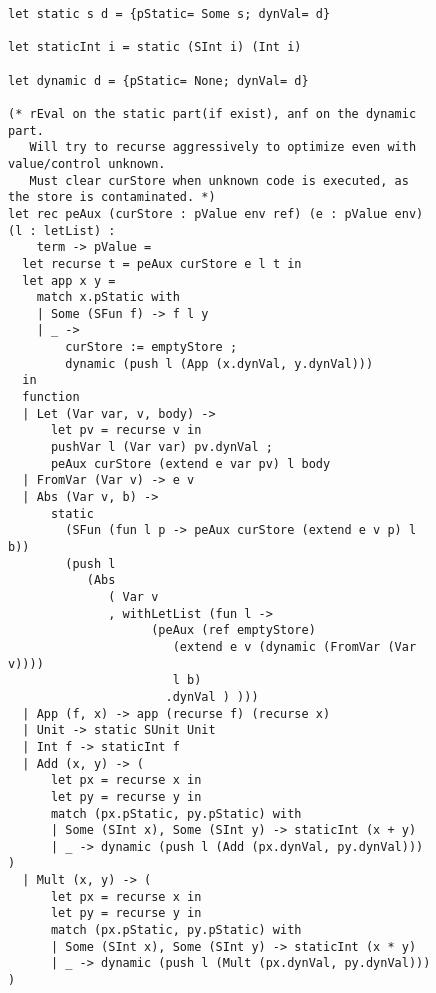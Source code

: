 \begin{figure}[H]
\ContinuedFloat
\begin{verbatim}
let static s d = {pStatic= Some s; dynVal= d}

let staticInt i = static (SInt i) (Int i)

let dynamic d = {pStatic= None; dynVal= d}

(* rEval on the static part(if exist), anf on the dynamic part.
   Will try to recurse aggressively to optimize even with value/control unknown.
   Must clear curStore when unknown code is executed, as the store is contaminated. *)
let rec peAux (curStore : pValue env ref) (e : pValue env) (l : letList) :
    term -> pValue =
  let recurse t = peAux curStore e l t in
  let app x y =
    match x.pStatic with
    | Some (SFun f) -> f l y
    | _ ->
        curStore := emptyStore ;
        dynamic (push l (App (x.dynVal, y.dynVal)))
  in
  function
  | Let (Var var, v, body) ->
      let pv = recurse v in
      pushVar l (Var var) pv.dynVal ;
      peAux curStore (extend e var pv) l body
  | FromVar (Var v) -> e v
  | Abs (Var v, b) ->
      static
        (SFun (fun l p -> peAux curStore (extend e v p) l b))
        (push l
           (Abs
              ( Var v
              , withLetList (fun l ->
                    (peAux (ref emptyStore)
                       (extend e v (dynamic (FromVar (Var v))))
                       l b)
                      .dynVal ) )))
  | App (f, x) -> app (recurse f) (recurse x)
  | Unit -> static SUnit Unit
  | Int f -> staticInt f
  | Add (x, y) -> (
      let px = recurse x in
      let py = recurse y in
      match (px.pStatic, py.pStatic) with
      | Some (SInt x), Some (SInt y) -> staticInt (x + y)
      | _ -> dynamic (push l (Add (px.dynVal, py.dynVal))) )
  | Mult (x, y) -> (
      let px = recurse x in
      let py = recurse y in
      match (px.pStatic, py.pStatic) with
      | Some (SInt x), Some (SInt y) -> staticInt (x * y)
      | _ -> dynamic (push l (Mult (px.dynVal, py.dynVal))) )
\end{verbatim}
\end{figure}

